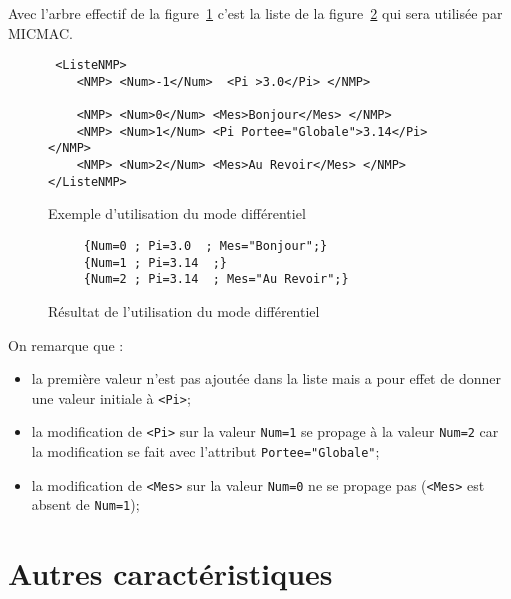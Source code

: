 Avec l'arbre effectif de la figure~\ref{DUG:ModDiff:AEff}
c'est la liste  de la figure~\ref{DUG:ModDiff:ResulMem}
qui sera utilis\'ee par MICMAC.


\begin{figure}
\begin{verbatim}
 <ListeNMP>
    <NMP> <Num>-1</Num>  <Pi >3.0</Pi> </NMP>

    <NMP> <Num>0</Num> <Mes>Bonjour</Mes> </NMP>
    <NMP> <Num>1</Num> <Pi Portee="Globale">3.14</Pi> </NMP>
    <NMP> <Num>2</Num> <Mes>Au Revoir</Mes> </NMP>
</ListeNMP>
\end{verbatim}
\caption {Exemple d'utilisation du mode diff\'erentiel }
\label{DUG:ModDiff:AEff}

\end{figure}


\begin{figure}
\begin{verbatim}
     {Num=0 ; Pi=3.0  ; Mes="Bonjour";}
     {Num=1 ; Pi=3.14  ;}
     {Num=2 ; Pi=3.14  ; Mes="Au Revoir";}
\end{verbatim}
\caption {R\'esultat de l'utilisation du mode diff\'erentiel }
\label{DUG:ModDiff:ResulMem}
\end{figure}

On remarque que :

\begin{itemize}

   \item la  premi\`ere valeur n'est pas ajout\'ee dans la liste mais
         a pour effet de donner une valeur initiale \`a {\tt <Pi>};

   \item  la modification de {\tt <Pi>} sur la valeur {\tt Num=1}
          se propage \`a la  valeur {\tt Num=2} car la modification 
          se fait avec l'attribut {\tt Portee="Globale"};

   \item  la modification de {\tt <Mes>} sur la valeur {\tt Num=0}
          ne se propage pas ({\tt <Mes>} est absent de {\tt Num=1});
\end{itemize}


\section{Autres caract\'eristiques}

